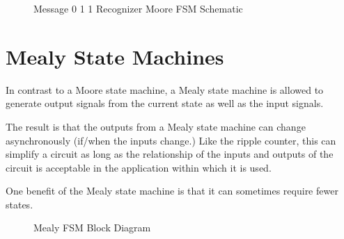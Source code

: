 \documentclass[10pt,letterpaper]{article}
\begin{document}
\begin{figure}[ht]
\centering
{}
\caption{Message 0 1 1 Recognizer Moore FSM Schematic}
\label{schematic:moore.message.011}
\end{figure}


\FloatBarrier
\newpage

\section{Mealy State Machines}

In contrast to a Moore state machine, a Mealy state machine is allowed to 
generate output signals from the current state as well as the input signals.

The result is that the outputs from a Mealy state machine can change
asynchronously (if/when the inputs change.)
Like the ripple counter, this can simplify a circuit as long as the 
relationship of the inputs and outputs of the circuit is acceptable 
in the application within which it is used.

One benefit of the Mealy state machine is that it can sometimes require
fewer states.

\begin{figure}[ht]
\centering

\scalebox{.75}{}

\caption{Mealy FSM Block Diagram}
\label{wav:mealy.block.diagram}
\end{figure}
\end{document}
